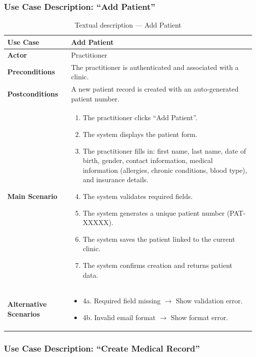 \documentclass[12pt,a4paper,oneside]{report}
\begin{document}
\subsubsection{Use Case Description: ``Add Patient''}

\begin{table}[H]
\centering
\caption{Textual description — Add Patient}
\label{tab:uc_add_patient}
\begin{tabular}{|p{3.5cm}|p{9.5cm}|}
\hline
\textbf{Use Case} & Add Patient \\
\hline
\textbf{Actor} & Practitioner \\
\hline
\textbf{Preconditions} & The practitioner is authenticated and associated with a clinic. \\
\hline
\textbf{Postconditions} & A new patient record is created with an auto-generated patient number. \\
\hline
\textbf{Main Scenario} &
\begin{enumerate}[leftmargin=*, nosep]
    \item The practitioner clicks ``Add Patient''.
    \item The system displays the patient form.
    \item The practitioner fills in: first name, last name, date of birth, gender, contact information, medical information (allergies, chronic conditions, blood type), and insurance details.
    \item The system validates required fields.
    \item The system generates a unique patient number (PAT-XXXXX).
    \item The system saves the patient linked to the current clinic.
    \item The system confirms creation and returns patient data.
\end{enumerate} \\
\hline
\textbf{Alternative Scenarios} &
\begin{itemize}[leftmargin=*, nosep]
    \item 4a. Required field missing $\rightarrow$ Show validation error.
    \item 4b. Invalid email format $\rightarrow$ Show format error.
\end{itemize} \\
\hline
\end{tabular}
\end{table}

\subsubsection{Use Case Description: ``Create Medical Record''}
\end{document}
